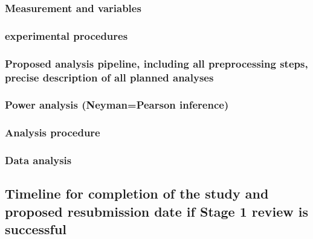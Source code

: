 \documentclass[
  english,
  man]{apa6}
\begin{document}
\hypertarget{measurement-and-variables-1}{%
\subsubsection{Measurement and variables}\label{measurement-and-variables-1}}

\hypertarget{experimental-procedures-1}{%
\subsubsection{experimental procedures}\label{experimental-procedures-1}}

\hypertarget{proposed-analysis-pipeline-including-all-preprocessing-steps-precise-description-of-all-planned-analyses-1}{%
\subsubsection{Proposed analysis pipeline, including all preprocessing steps, precise description of all planned analyses}\label{proposed-analysis-pipeline-including-all-preprocessing-steps-precise-description-of-all-planned-analyses-1}}

\hypertarget{power-analysis-neymanpearson-inference-1}{%
\subsubsection{Power analysis (Neyman=Pearson inference)}\label{power-analysis-neymanpearson-inference-1}}

\hypertarget{analysis-procedure-1}{%
\subsubsection{Analysis procedure}\label{analysis-procedure-1}}

\hypertarget{data-analysis-1}{%
\subsubsection{Data analysis}\label{data-analysis-1}}

\hypertarget{timeline-for-completion-of-the-study-and-proposed-resubmission-date-if-stage-1-review-is-successful}{%
\subsection{Timeline for completion of the study and proposed resubmission date if Stage 1 review is successful}\label{timeline-for-completion-of-the-study-and-proposed-resubmission-date-if-stage-1-review-is-successful}}
\end{document}
